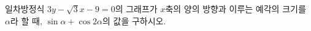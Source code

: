 일차방정식 $3y-\sqrt{3}x-9=0$의 그래프가 $x$축의 양의 방향과 이루는 예각의 크기를 $\alpha$라 할 때, $\sin\alpha+\cos 2\alpha$의 값을 구하시오.
